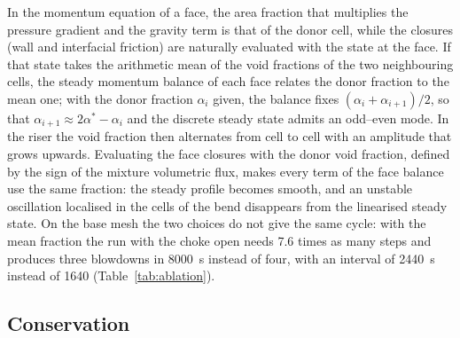 \documentclass[a4paper,fleqn]{cas-sc}
\begin{document}
In the momentum equation of a face, the area fraction that multiplies the pressure gradient and the gravity term is that of the donor cell, while the closures (wall and interfacial friction) are naturally evaluated with the state at the face. If that state takes the arithmetic mean of the void fractions of the two neighbouring cells, the steady momentum balance of each face relates the donor fraction to the mean one; with the donor fraction $\alpha_i$ given, the balance fixes $(\alpha_i + \alpha_{i+1})/2$, so that $\alpha_{i+1} \approx 2\alpha^\ast - \alpha_i$ and the discrete steady state admits an odd--even mode. In the riser the void fraction then alternates from cell to cell with an amplitude that grows upwards. Evaluating the face closures with the donor void fraction, defined by the sign of the mixture volumetric flux, makes every term of the face balance use the same fraction: the steady profile becomes smooth, and an unstable oscillation localised in the cells of the bend disappears from the linearised steady state. On the base mesh the two choices do not give the same cycle: with the mean fraction the run with the choke open needs 7.6 times as many steps and produces three blowdowns in \SI{8000}{\second} instead of four, with an interval of \SI{2440}{\second} instead of 1640 (Table~\ref{tab:ablation}).

\subsection{Conservation}\label{sec:conservation}
\end{document}
